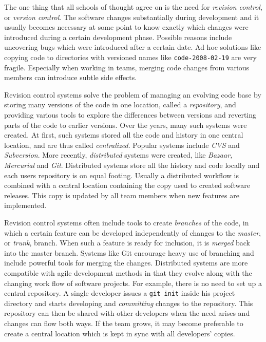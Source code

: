 The one thing that all schools of thought agree on is the need for
\emph{revision control}, or \emph{version control}.  The software changes
substantially during development and it usually becomes necessary at some point
to know exactly which changes were introduced during a certain development
phase.  Possible reasons include uncovering bugs which were introduced after a
certain date.  Ad hoc solutions like copying code to directories with versioned
names like \verb|code-2008-02-19| are very fragile.  Especially when working in
teams, merging code changes from various members can introduce subtle side
effects.

Revision control systems solve the problem of managing an evolving code base by
storing many versions of the code in one location, called a \emph{repository},
and providing various tools to explore the differences between versions and
reverting parts of the code to earlier versions.  Over the years, many such
systems were created.  At first, such systems stored all the code and history in
one central location, and are thus called \emph{centralized}.  Popular systems
include \emph{CVS} and \emph{Subversion}.  More recently, \emph{distributed}
systems were created, like \emph{Bazaar, Mercurial} and \emph{Git}.  Distributed
systems store all the history and code locally and each users repository is on
equal footing.  Usually a distributed workflow is combined with a central
location containing the copy used to created software releases.  This copy is
updated by all team members when new features are implemented.

Revision control systems often include tools to create \emph{branches} of the
code, in which a certain feature can be developed independently of changes to
the \emph{master}, or \emph{trunk}, branch.  When such a feature is ready for
inclusion, it is \emph{merged} back into the master branch.  Systems like Git
encourage heavy use of branching and include powerful tools for merging the
changes.  Distributed systems are more compatible with agile development methods
in that they evolve along with the changing work flow of software projects.  For
example, there is no need to set up a central repository.  A single developer
issues a \verb|git init| inside his project directory and starts developing and
\emph{committing} changes to the repository.  This repository can then be shared
with other developers when the need arises and changes can flow both ways.  If
the team grows, it may become preferable to create a central location which is
kept in sync with all developers' copies.

